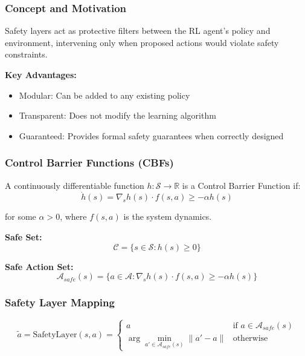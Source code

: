 \documentclass[12pt]{article}
\begin{document}
{{{{\subsubsection{Concept and Motivation}

Safety layers act as protective filters between the RL agent's policy and environment, intervening only when proposed actions would violate safety constraints.

\textbf{Key Advantages:}
\begin{itemize}
\item Modular: Can be added to any existing policy
\item Transparent: Does not modify the learning algorithm
\item Guaranteed: Provides formal safety guarantees when correctly designed
\end{itemize}

\subsubsection{Control Barrier Functions (CBFs)}

A continuously differentiable function $h: \mathcal{S} \rightarrow \mathbb{R}$ is a Control Barrier Function if:
\begin{equation}
\dot{h}(s) = \nabla_s h(s) \cdot f(s,a) \geq -\alpha h(s)
\end{equation}

for some $\alpha > 0$, where $f(s,a)$ is the system dynamics.

\textbf{Safe Set:}
\begin{equation}
\mathcal{C} = \{s \in \mathcal{S} : h(s) \geq 0\}
\end{equation}

\textbf{Safe Action Set:}
\begin{equation}
\mathcal{A}_{safe}(s) = \{a \in \mathcal{A} : \nabla_s h(s) \cdot f(s,a) \geq -\alpha h(s)\}
\end{equation}

\subsubsection{Safety Layer Mapping}

\begin{equation}
\tilde{a} = \text{SafetyLayer}(s, a) =
\begin{cases}
a & \text{if } a \in \mathcal{A}_{safe}(s) \\
\arg\min_{a' \in \mathcal{A}_{safe}(s)} \|a' - a\| & \text{otherwise}
\end{cases}
\end{equation}

}}}}
\end{document}
